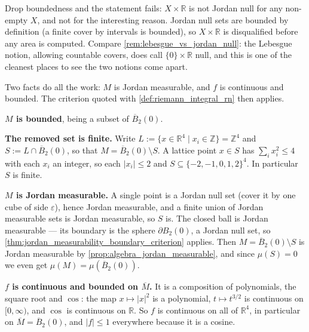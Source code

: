 \begin{exercisesolution}
\begin{remark}
Drop boundedness and the statement fails: $X \times \mathbb{R}$ is not Jordan null for any
non-empty $X$, and not for the interesting reason. Jordan null sets are bounded by definition
(a finite cover by intervals is bounded), so $X \times \mathbb{R}$ is disqualified before any
area is computed. Compare \cref{rem:lebesgue_vs_jordan_null}: the Lebesgue notion, allowing
countable covers, does call $\{0\}\times\mathbb{R}$ null, and this is one of the cleanest places
to see the two notions come apart.
\end{remark}
\end{exercisesolution}

\begin{exercisesolution}
\label{sol:kobel_ball_minus_lattice}
Two facts do all the work: $M$ is Jordan measurable, and $f$ is continuous and bounded. The
criterion quoted with \cref{def:riemann_integral_rn} then applies.

\textbf{$M$ is bounded}, being a subset of $\overline{B}_2(0)$.

\textbf{The removed set is finite.} Write $L := \{x \in \mathbb{R}^4 \mid x_i \in \mathbb{Z}\}
= \mathbb{Z}^4$ and $S := L \cap \overline{B}_2(0)$, so that $M = \overline{B}_2(0)\setminus S$. A
lattice point $x \in S$ has $\sum_i x_i^2 \le 4$ with each $x_i$ an integer, so each $|x_i| \le 2$
and $S \subseteq \{-2,-1,0,1,2\}^4$. In particular $S$ is finite.

\textbf{$M$ is Jordan measurable.} A single point is a Jordan null set (cover it by one cube of
side $\varepsilon$), hence Jordan measurable, and a finite union of Jordan measurable sets is
Jordan measurable, so $S$ is. The closed ball is Jordan measurable --- its boundary is the sphere
$\partial B_2(0)$, a Jordan null set, so
\cref{thm:jordan_measurability_boundary_criterion} applies. Then
$M = \overline{B}_2(0)\setminus S$ is Jordan measurable by
\cref{prop:algebra_jordan_measurable}, and since $\mu(S) = 0$ we even get
$\mu(M) = \mu(\overline{B}_2(0))$.

\textbf{$f$ is continuous and bounded on $\overline{M}$.} It is a composition of polynomials, the
square root and $\cos$: the map $x \mapsto |x|^2$ is a polynomial, $t \mapsto t^{3/2}$ is
continuous on $[0,\infty)$, and $\cos$ is continuous on $\mathbb{R}$. So $f$ is continuous on all
of $\mathbb{R}^4$, in particular on $\overline{M} = \overline{B}_2(0)$, and
$\lvert f\rvert \le 1$ everywhere because it is a cosine.


\end{exercisesolution}
